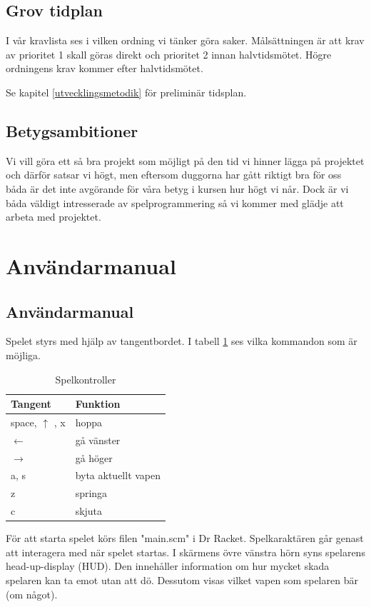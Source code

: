 \documentclass{scrartcl}
\begin{document}
\subsection{Grov tidplan}
I vår kravlista ses i vilken ordning vi tänker göra saker. Målsättningen är att krav av prioritet 1 skall göras direkt och prioritet 2 innan halvtidsmötet. Högre ordningens krav kommer efter halvtidsmötet.

Se kapitel \ref{utvecklingsmetodik} för preliminär tidsplan.

\subsection{Betygsambitioner}
Vi vill göra ett så bra projekt som möjligt på den tid vi hinner lägga på projektet och därför satsar vi högt, men eftersom duggorna har gått riktigt bra för oss båda är det inte avgörande för våra betyg i kursen hur högt vi når. Dock är vi båda väldigt intresserade av spelprogrammering så vi kommer med glädje att arbeta med projektet.

\section{Användarmanual}
\subsection{Användarmanual}

Spelet styrs med hjälp av tangentbordet. I tabell \ref{kontroller} ses vilka kommandon som är möjliga. 

\begin{table}[ht]
\caption{Spelkontroller}\label{kontroller}
\centering
    \begin{tabular}{ll}
    \toprule
    Tangent  & Funktion \\
    \midrule
    space, $\uparrow$ , x & hoppa \\
    $\leftarrow$  & gå vänster \\
    $\rightarrow$ & gå höger \\
    a, s     & byta aktuellt vapen \\
    z        & springa \\
    c        & skjuta \\
    \bottomrule
    \end{tabular}
\end{table}

För att starta spelet körs filen "main.scm" i Dr Racket. Spelkaraktären går genast att interagera med när spelet startas. I skärmens övre vänstra hörn syns spelarens head-up-display (HUD). Den innehåller information om hur mycket skada spelaren kan ta emot utan att dö. Dessutom visas vilket vapen som spelaren bär (om något). 
\end{document}
